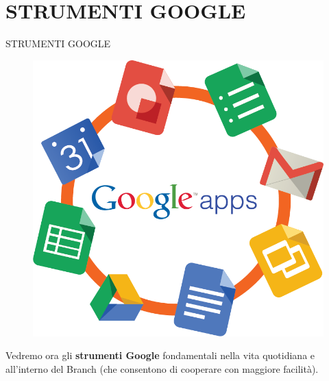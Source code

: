 \documentclass{beamer}
\begin{document}
\section{STRUMENTI GOOGLE}
\begin{frame}{STRUMENTI GOOGLE}
\begin{figure}[h!]
\includegraphics[height=0.6\textheight]{immagini/google-app.png}
\end{figure}
Vedremo ora gli \textbf{strumenti Google} fondamentali nella vita quotidiana e all'interno del Branch (che consentono di cooperare con maggiore facilità).
\end{frame}
\end{document}
